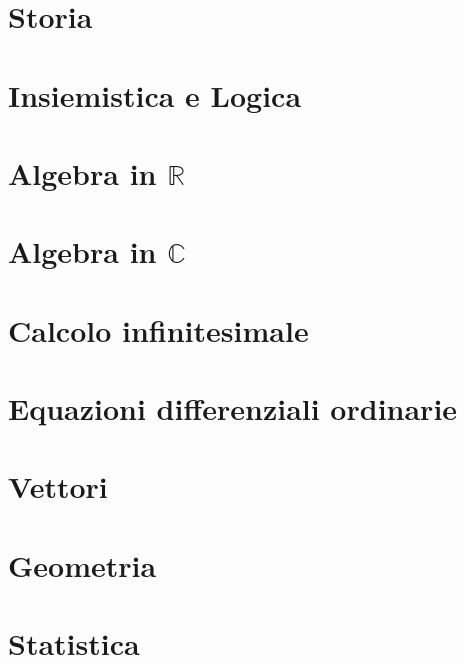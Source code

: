 
\part{Storia}


\part{Insiemistica e Logica}

\part{Algebra in $\mathbb{R}$}


\part{Algebra in $\mathbb{C}$}\label{book:complex_algebra}


\part{Calcolo infinitesimale}


\part{Equazioni differenziali ordinarie}


\part{Vettori}


\part{Geometria}


\part{Statistica}
